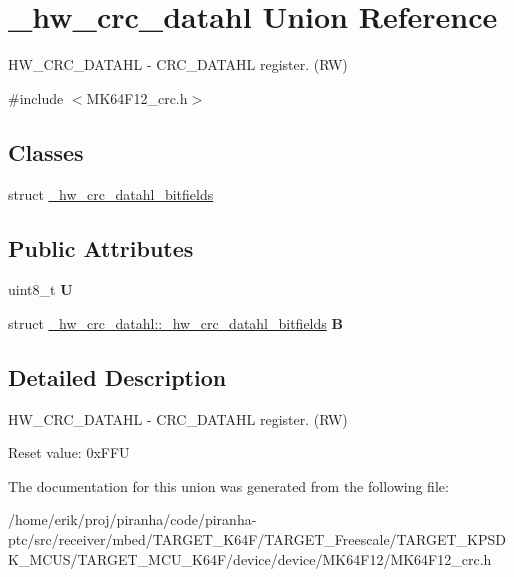 \hypertarget{union__hw__crc__datahl}{}\section{\+\_\+hw\+\_\+crc\+\_\+datahl Union Reference}
\label{union__hw__crc__datahl}


H\+W\+\_\+\+C\+R\+C\+\_\+\+D\+A\+T\+A\+HL -\/ C\+R\+C\+\_\+\+D\+A\+T\+A\+HL register. (RW)  




{\ttfamily \#include $<$M\+K64\+F12\+\_\+crc.\+h$>$}

\subsection*{Classes}
\begin{DoxyCompactItemize}
\item 
struct \hyperlink{struct__hw__crc__datahl_1_1__hw__crc__datahl__bitfields}{\+\_\+hw\+\_\+crc\+\_\+datahl\+\_\+bitfields}
\end{DoxyCompactItemize}
\subsection*{Public Attributes}
\begin{DoxyCompactItemize}
\item 
uint8\+\_\+t {\bfseries U}\hypertarget{union__hw__crc__datahl_a6e1d3472e9d75ea3cb524069401f70bc}{}\label{union__hw__crc__datahl_a6e1d3472e9d75ea3cb524069401f70bc}

\item 
struct \hyperlink{struct__hw__crc__datahl_1_1__hw__crc__datahl__bitfields}{\+\_\+hw\+\_\+crc\+\_\+datahl\+::\+\_\+hw\+\_\+crc\+\_\+datahl\+\_\+bitfields} {\bfseries B}\hypertarget{union__hw__crc__datahl_a1e7396387c9f7323d1e5a2552d488ce4}{}\label{union__hw__crc__datahl_a1e7396387c9f7323d1e5a2552d488ce4}

\end{DoxyCompactItemize}


\subsection{Detailed Description}
H\+W\+\_\+\+C\+R\+C\+\_\+\+D\+A\+T\+A\+HL -\/ C\+R\+C\+\_\+\+D\+A\+T\+A\+HL register. (RW) 

Reset value\+: 0x\+F\+FU 

The documentation for this union was generated from the following file\+:\begin{DoxyCompactItemize}
\item 
/home/erik/proj/piranha/code/piranha-\/ptc/src/receiver/mbed/\+T\+A\+R\+G\+E\+T\+\_\+\+K64\+F/\+T\+A\+R\+G\+E\+T\+\_\+\+Freescale/\+T\+A\+R\+G\+E\+T\+\_\+\+K\+P\+S\+D\+K\+\_\+\+M\+C\+U\+S/\+T\+A\+R\+G\+E\+T\+\_\+\+M\+C\+U\+\_\+\+K64\+F/device/device/\+M\+K64\+F12/M\+K64\+F12\+\_\+crc.\+h\end{DoxyCompactItemize}
